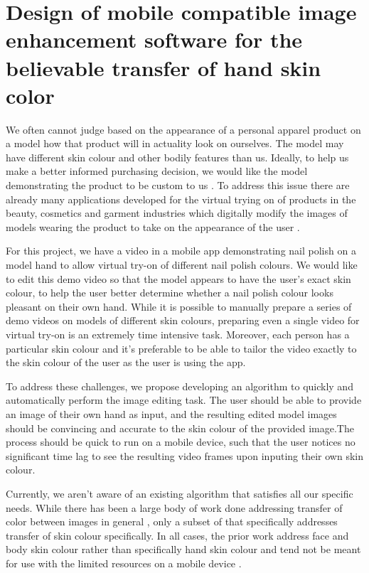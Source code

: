 \documentclass[12pt, a4paper]{article}
\begin{document}
\section*{Design of mobile compatible image enhancement software for the believable transfer of hand skin color}

We often cannot judge based on the appearance of a personal apparel product on a model how that product will in actuality look on ourselves. The model may have different skin colour and other bodily features than us. Ideally, to help us make a better informed purchasing decision, we would like the model demonstrating the product to be custom to us \cite{zhang_2017_try}. To address this issue there are already many applications developed for the virtual trying on of products in the beauty, cosmetics and garment industries which digitally modify the images of models wearing the product to take on the appearance of the user \cite{zhang_2017_try} \cite{shilkrot_2013_garment, li_2015_replace}.

For this project, we have a video in a mobile app demonstrating nail polish on a model hand to allow virtual try-on of different nail polish colours. We would like to edit this demo video so that the model appears to have the user's exact skin colour, to help the user better determine whether a nail polish colour looks pleasant on their own hand. While it is possible to manually prepare a series of demo videos on models of different skin colours, preparing even a single video for virtual try-on is an extremely time intensive task. Moreover, each person has a particular skin colour and it's preferable to be able to tailor the video exactly to the skin colour of the user as the user is using the app.

To address these challenges, we propose developing an algorithm to quickly and automatically perform the image editing task. The user should be able to provide an image of their own hand as input, and the resulting edited model images should be convincing and accurate to the skin colour of the provided image.The process should be quick to run on a mobile device, such that the user notices no significant time lag to see the resulting video frames upon inputing their own skin colour. 

Currently, we aren't aware of an existing algorithm that satisfies all our specific needs. While there has been a large body of work done addressing transfer of color between images in general \cite{reinhard_2001_transfer, pitie_2005_pdf, chang_2015_palette}, only a subset of that specifically addresses transfer of skin colour specifically. In all cases, the prior work address face and body skin colour rather than specifically hand skin colour and tend not be meant for use with the limited resources on a mobile device \cite{yin_2004_transfer, seo_2005_transfer}.
\end{document}
